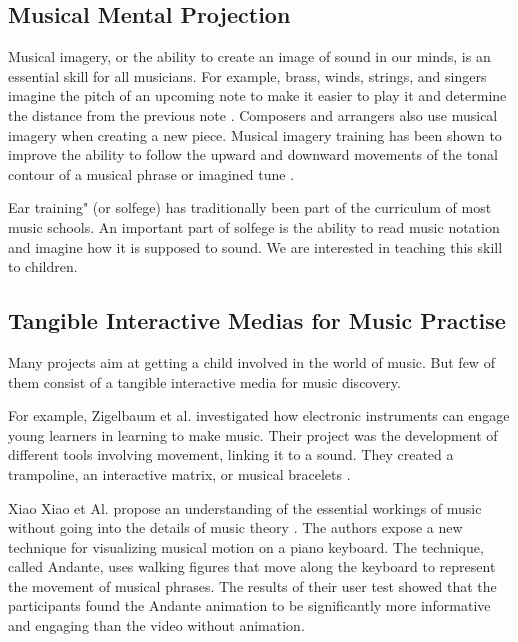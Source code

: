 \subsection{Musical Mental Projection}

Musical imagery, or the ability to create an image of sound in our minds, is an essential
skill for all musicians. For example, brass, winds, strings, and singers imagine the
pitch of an upcoming note to make it easier to play it and determine the distance from
the previous note
\cite{zatorre2005mental}. Composers and arrangers also use musical imagery when creating
a new piece. Musical imagery training has been shown to improve the ability to follow
the upward and downward movements of the tonal contour of a musical phrase or
imagined tune
\cite{weber1986musical}.

Ear training" (or solfege) has traditionally been part of the curriculum of most music
schools. An important part of solfege is the ability to read music notation and imagine
how it is supposed to sound. We are interested in teaching this skill to children.

\subsection{Tangible Interactive Medias for Music Practise}

Many projects aim at getting a child involved in the world of music. But few of them consist of a tangible interactive media for music discovery.

For example, Zigelbaum et al. investigated how electronic instruments can engage young learners in learning to make music. Their project was the development of different tools involving movement, linking it to a sound. They created a trampoline, an interactive matrix, or musical bracelets \cite{zigelbaum2006bodybeats}.

Xiao Xiao et Al. propose an understanding of the essential workings of music without going into the details of music theory \cite{xiao2014andante}.
The authors expose a new technique for visualizing musical motion on a piano keyboard. The technique, called Andante, uses walking figures that move along the keyboard to represent the movement of musical phrases. The results of their user test showed that the participants found the Andante animation to be significantly more informative and engaging than the video without animation.

